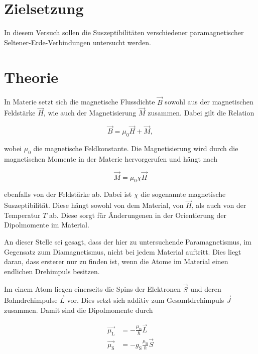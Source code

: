 \section{Zielsetzung}

In diesem Versuch sollen die Suszeptibilitäten verschiedener paramagnetischer Seltener-Erde-Verbindungen untersucht werden.

\section{Theorie}
\label{sec:Theorie}

In Materie setzt sich die magnetische Flussdichte $\vec{B}$ sowohl aus der magnetischen Feldstärke $\vec{H}$, wie auch der Magnetisierung $\vec{M}$ zusammen.
Dabei gilt die Relation 

\begin{equation}
    \label{eqn:mag-allg}
    \vec{B} = \mu_0 \vec{H} + \vec{M},
\end{equation}

wobei $\mu_0$ die magnetische Feldkonstante. 
Die Magnetisierung wird durch die magnetischen Momente in der Materie hervorgerufen und hängt nach 

\begin{equation}
    \label{eqn:magnetisierung}
    \vec{M} = \mu_0 \chi \vec{H}
\end{equation}

ebenfalls von der Feldstärke ab.
Dabei ist $\chi$ die sogenannte magnetische Suszeptibilität. Diese hängt sowohl von dem Material, von $\vec{H}$, als auch von der Temperatur $T$ ab.
Diese sorgt für Änderungenen in der Orientierung der Dipolmomente im Material.

An dieser Stelle sei gesagt, dass der hier zu untersuchende Paramagnetismus, im Gegensatz zum Diamagnetismus, nicht bei jedem Material auftritt.
Dies liegt daran, dass ersterer nur zu finden ist, wenn die Atome im Material einen endlichen Drehimpuls besitzen.

Im einem Atom liegen einerseits die Spins der Elektronen $\vec{S}$ und deren Bahndrehimpulse $\vec{L}$ vor.
Dies setzt sich additiv zum Gesamtdrehimpuls $\vec{J}$ zusammen.
Damit sind die Dipolmomente durch

\begin{align}
    \vec{\mu_\text{L}} &= - \frac{\mu_\text{B}}{\hslash} \vec{L} \\
    \vec{\mu_\text{S}} &= - g_\text{S} \frac{\mu_\text{B}}{\hslash} \vec{S}
\end{align}

